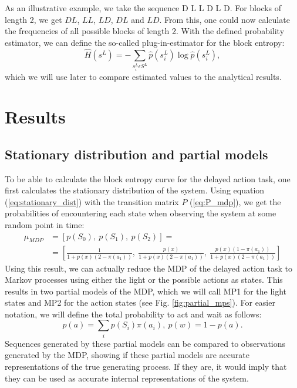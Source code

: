 \documentclass[12pt,a4paper]{article}
\begin{document}
As an illustrative example, we take the sequence D L L D L D.
For blocks of length 2, we get $DL$, $LL$, $LD$, $DL$ and $LD$.
From this, one could now calculate the frequencies of all possible blocks of length 2.
With the defined probability estimator, we can define the so-called plug-in-estimator for the block entropy:
\begin{equation}
    \label{eq:plug_in_block_ent}
    \hat{H}(s^L) = -\sum_{s_i^L \epsilon S^L} \hat{p}(s_i^L) \log \hat{p}(s_i^L),
\end{equation}
which we will use later to compare estimated values to the analytical results.

\newpage
\section{Results} \label{sec:results}

\subsection{Stationary distribution and partial models} \label{ssec:res_stationary_dist}
To be able to calculate the block entropy curve for the delayed action task, one first calculates the stationary distribution of the system.
Using equation (\ref{eq:stationary_dist}) with the transition matrix $P$ (\ref{eq:P_mdp}), we get the probabilities of encountering each state when observing the system at some random point in time:
\begin{equation}
    \label{eq:result_stationary_dist_mdp}
    \begin{split}
        \mu_{MDP} &= [p(S_0),\ p(S_1),\ p(S_2)] =       \\
        &=[\frac{1}{1 + p(x)(2-\pi(a_1))},\
        \frac{p(x)}{1 + p(x)(2-\pi(a_1))},\
        \frac{p(x)(1-\pi(a_1))}{1 + p(x)(2-\pi(a_1))}]
    \end{split}
\end{equation}
Using this result, we can actually reduce the MDP of the delayed action task to Markov processes using either the light or the possible actions as states.
This results in two partial models of the MDP, which we will call MP1 for the light states and MP2 for the action states (see Fig. \ref{fig:partial_mps}).
For easier notation, we will define the total probability to act and wait as follows:
\begin{equation}
    \label{eq:result_prob_act_wait}
    p(a) = \sum_i p(S_i)\pi(a_i),\ p(w) = 1 - p(a).
\end{equation}
Sequences generated by these partial models can be compared to observations generated by the MDP, showing if these partial models are accurate representations of the true generating process.
If they are, it would imply that they can be used as accurate internal representations of the system.
\end{document}
